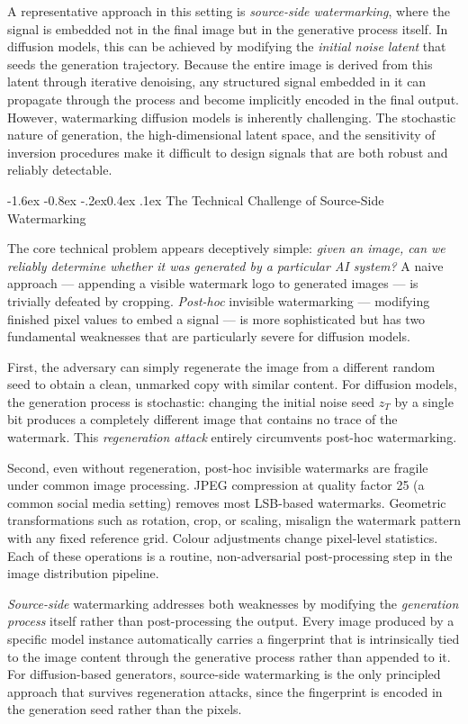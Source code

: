 \documentclass[10pt,twocolumn]{article}
\makeatletter
\renewcommand\subsection{\@startsection{subsection}{2}{\z@}%
  {-1.6ex \@plus -0.8ex \@minus -.2ex}{0.4ex \@plus .1ex}%
  {\normalfont\normalsize\itshape}}
\makeatother
\begin{document}
A representative approach in this setting is \textit{source-side
watermarking}, where the signal is embedded not in the final image but
in the generative process itself. In diffusion models, this can be
achieved by modifying the \emph{initial noise latent} that seeds the
generation trajectory. Because the entire image is derived from this
latent through iterative denoising, any structured signal embedded in it
can propagate through the process and become implicitly encoded in the
final output. However, watermarking diffusion models is inherently challenging.
The stochastic nature of generation, the high-dimensional latent space,
and the sensitivity of inversion procedures make it difficult to design
signals that are both robust and reliably detectable.


\subsection{The Technical Challenge of Source-Side Watermarking}

The core technical problem appears deceptively simple: \emph{given an
image, can we reliably determine whether it was generated by a
particular AI system?}
A naive approach --- appending a visible watermark logo to generated
images --- is trivially defeated by cropping.
\emph{Post-hoc} invisible watermarking --- modifying finished pixel
values to embed a signal --- is more sophisticated but has two
fundamental weaknesses that are particularly severe for diffusion models.

First, the adversary can simply regenerate the image from a different
random seed to obtain a clean, unmarked copy with similar content.
For diffusion models, the generation process is stochastic: changing
the initial noise seed $z_T$ by a single bit produces a completely
different image that contains no trace of the watermark.
This \emph{regeneration attack} entirely circumvents post-hoc
watermarking.

Second, even without regeneration, post-hoc invisible watermarks are
fragile under common image processing.
JPEG compression at quality factor 25 (a common social media setting)
removes most LSB-based watermarks.
Geometric transformations such as rotation, crop, or scaling, misalign the
watermark pattern with any fixed reference grid.
Colour adjustments change pixel-level statistics.
Each of these operations is a routine, non-adversarial post-processing
step in the image distribution pipeline.

\emph{Source-side} watermarking addresses both weaknesses by modifying
the \emph{generation process} itself rather than post-processing the
output.
Every image produced by a specific model instance automatically carries
a fingerprint that is intrinsically tied to the image content through
the generative process rather than appended to it.
For diffusion-based generators, source-side watermarking is the only
principled approach that survives regeneration attacks, since the
fingerprint is encoded in the generation seed rather than the pixels.
\end{document}
